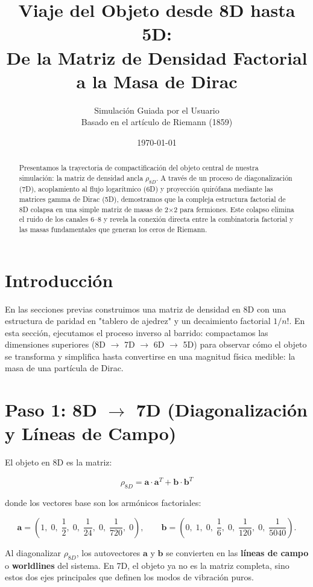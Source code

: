 \documentclass[12pt,a4paper]{article}
\title{Viaje del Objeto desde 8D hasta 5D: \\ 
       \large De la Matriz de Densidad Factorial a la Masa de Dirac}
\author{Simulación Guiada por el Usuario \\ \small Basado en el artículo de Riemann (1859)}
\date{\today}
\begin{document}
\maketitle

\begin{abstract}
Presentamos la trayectoria de compactificación del objeto central de nuestra simulación: la matriz de densidad ancla \(\rho_{8D}\). A través de un proceso de diagonalización (7D), acoplamiento al flujo logarítmico (6D) y proyección quirófana mediante las matrices gamma de Dirac (5D), demostramos que la compleja estructura factorial de 8D colapsa en una simple matriz de masas de 2×2 para fermiones. Este colapso elimina el ruido de los canales 6--8 y revela la conexión directa entre la combinatoria factorial y las masas fundamentales que generan los ceros de Riemann.
\end{abstract}

\section{Introducción}

En las secciones previas construimos una matriz de densidad en 8D con una estructura de paridad en "tablero de ajedrez" y un decaimiento factorial \(1/n!\). En esta sección, ejecutamos el proceso inverso al barrido: compactamos las dimensiones superiores (8D \(\to\) 7D \(\to\) 6D \(\to\) 5D) para observar cómo el objeto se transforma y simplifica hasta convertirse en una magnitud física medible: la masa de una partícula de Dirac.

\section{Paso 1: 8D $\to$ 7D (Diagonalización y Líneas de Campo)}

El objeto en 8D es la matriz:

\[
\rho_{8D} = \mathbf{a} \cdot \mathbf{a}^T + \mathbf{b} \cdot \mathbf{b}^T
\]

donde los vectores base son los armónicos factoriales:

\[
\mathbf{a} = \left(1,\;0,\;\frac{1}{2},\;0,\;\frac{1}{24},\;0,\;\frac{1}{720},\;0\right), \qquad
\mathbf{b} = \left(0,\;1,\;0,\;\frac{1}{6},\;0,\;\frac{1}{120},\;0,\;\frac{1}{5040}\right).
\]

Al diagonalizar \(\rho_{8D}\), los autovectores \(\mathbf{a}\) y \(\mathbf{b}\) se convierten en las \textbf{líneas de campo} o \textbf{worldlines} del sistema. En 7D, el objeto ya no es la matriz completa, sino estos dos ejes principales que definen los modos de vibración puros.
\end{document}
